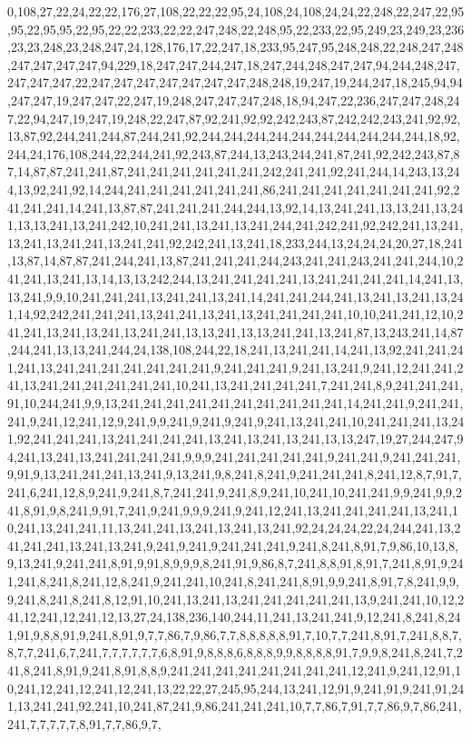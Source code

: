 0,108,27,22,24,22,22,176,27,108,22,22,22,95,24,108,24,108,24,24,22,248,22,247,22,95,95,22,95,95,22,95,22,22,233,22,22,247,248,22,248,95,22,233,22,95,249,23,249,23,236,23,23,248,23,248,247,24,128,176,17,22,247,18,233,95,247,95,248,248,22,248,247,248,247,247,247,247,94,229,18,247,247,244,247,18,247,244,248,247,247,94,244,248,247,247,247,247,22,247,247,247,247,247,247,247,248,248,19,247,19,244,247,18,245,94,94,247,247,19,247,247,22,247,19,248,247,247,247,248,18,94,247,22,236,247,247,248,247,22,94,247,19,247,19,248,22,247,87,92,241,92,92,242,243,87,242,242,243,241,92,92,13,87,92,244,241,244,87,244,241,92,244,244,244,244,244,244,244,244,244,244,18,92,244,24,176,108,244,22,244,241,92,243,87,244,13,243,244,241,87,241,92,242,243,87,87,14,87,87,241,241,87,241,241,241,241,241,241,242,241,241,92,241,244,14,243,13,244,13,92,241,92,14,244,241,241,241,241,241,241,86,241,241,241,241,241,241,241,92,241,241,241,14,241,13,87,87,241,241,241,244,244,13,92,14,13,241,241,13,13,241,13,241,13,13,241,13,241,242,10,241,241,13,241,13,241,244,241,242,241,92,242,241,13,241,13,241,13,241,241,13,241,241,92,242,241,13,241,18,233,244,13,24,24,24,20,27,18,241,13,87,14,87,87,241,244,241,13,87,241,241,241,244,243,241,241,243,241,241,244,10,241,241,13,241,13,14,13,13,242,244,13,241,241,241,241,13,241,241,241,241,14,241,13,13,241,9,9,10,241,241,241,13,241,241,13,241,14,241,241,244,241,13,241,13,241,13,241,14,92,242,241,241,241,13,241,241,13,241,13,241,241,241,241,10,10,241,241,12,10,241,241,13,241,13,241,13,241,241,13,13,241,13,13,241,241,13,241,87,13,243,241,14,87,244,241,13,13,241,244,24,138,108,244,22,18,241,13,241,241,14,241,13,92,241,241,241,241,13,241,241,241,241,241,241,241,9,241,241,241,9,241,13,241,9,241,12,241,241,241,13,241,241,241,241,241,241,10,241,13,241,241,241,241,7,241,241,8,9,241,241,241,91,10,244,241,9,9,13,241,241,241,241,241,241,241,241,241,241,14,241,241,9,241,241,241,9,241,12,241,12,9,241,9,9,241,9,241,9,241,9,241,13,241,241,10,241,241,241,13,241,92,241,241,241,13,241,241,241,241,13,241,13,241,13,241,13,13,247,19,27,244,247,94,241,13,241,13,241,241,241,241,9,9,9,241,241,241,241,241,9,241,241,9,241,241,241,9,91,9,13,241,241,241,13,241,9,13,241,9,8,241,8,241,9,241,241,241,8,241,12,8,7,91,7,241,6,241,12,8,9,241,9,241,8,7,241,241,9,241,8,9,241,10,241,10,241,241,9,9,241,9,9,241,8,91,9,8,241,9,91,7,241,9,241,9,9,9,241,9,241,12,241,13,241,241,241,241,13,241,10,241,13,241,241,11,13,241,241,13,241,13,241,13,241,92,24,24,24,22,24,244,241,13,241,241,241,13,241,13,241,9,241,9,241,9,241,241,241,9,241,8,241,8,91,7,9,86,10,13,8,9,13,241,9,241,241,8,91,9,91,8,9,9,9,8,241,91,9,86,8,7,241,8,8,91,8,91,7,241,8,91,9,241,241,8,241,8,241,12,8,241,9,241,241,10,241,8,241,241,8,91,9,9,241,8,91,7,8,241,9,9,9,241,8,241,8,241,8,12,91,10,241,13,241,13,241,241,241,241,241,13,9,241,241,10,12,241,12,241,12,241,12,13,27,24,138,236,140,244,11,241,13,241,241,9,12,241,8,241,8,241,91,9,8,8,91,9,241,8,91,9,7,7,86,7,9,86,7,7,8,8,8,8,8,91,7,10,7,7,241,8,91,7,241,8,8,7,8,7,7,241,6,7,241,7,7,7,7,7,7,6,8,91,9,8,8,8,6,8,8,8,9,9,8,8,8,8,91,7,9,9,8,241,8,241,7,241,8,241,8,91,9,241,8,91,8,8,9,241,241,241,241,241,241,241,241,12,241,9,241,12,91,10,241,12,241,12,241,12,241,13,22,22,27,245,95,244,13,241,12,91,9,241,91,9,241,91,241,13,241,241,92,241,10,241,87,241,9,86,241,241,241,10,7,7,86,7,91,7,7,86,9,7,86,241,241,7,7,7,7,7,8,91,7,7,86,9,7,